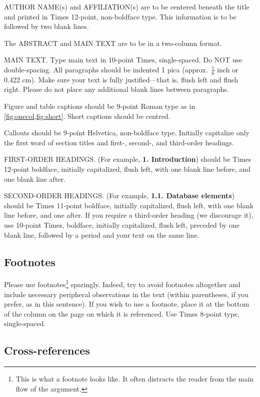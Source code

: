 \documentclass[10pt,twocolumn,letterpaper]{article}
\begin{document}
AUTHOR NAME(s) and AFFILIATION(s) are to be centered beneath the title
and printed in Times 12-point, non-boldface type.
This information is to be followed by two blank lines.

The ABSTRACT and MAIN TEXT are to be in a two-column format.

MAIN TEXT.
Type main text in 10-point Times, single-spaced.
Do NOT use double-spacing.
All paragraphs should be indented 1 pica (approx.~$\frac{1}{6}$ inch or 0.422 cm).
Make sure your text is fully justified---that is, flush left and flush right.
Please do not place any additional blank lines between paragraphs.

Figure and table captions should be 9-point Roman type as in \cref{fig:onecol,fig:short}.
Short captions should be centred.

\noindent Callouts should be 9-point Helvetica, non-boldface type.
Initially capitalize only the first word of section titles and first-, second-, and third-order headings.

FIRST-ORDER HEADINGS.
(For example, {\large \bf 1. Introduction}) should be Times 12-point boldface, initially capitalized, flush left, with one blank line before, and one blank line after.

SECOND-ORDER HEADINGS.
(For example, { \bf 1.1. Database elements}) should be Times 11-point boldface, initially capitalized, flush left, with one blank line before, and one after.
If you require a third-order heading (we discourage it), use 10-point Times, boldface, initially capitalized, flush left, preceded by one blank line, followed by a period and your text on the same line.

\subsection{Footnotes}

Please use footnotes\footnote{This is what a footnote looks like.
It often distracts the reader from the main flow of the argument.} sparingly.
Indeed, try to avoid footnotes altogether and include necessary peripheral observations in the text (within parentheses, if you prefer, as in this sentence).
If you wish to use a footnote, place it at the bottom of the column on the page on which it is referenced.
Use Times 8-point type, single-spaced.


\subsection{Cross-references}
\end{document}
